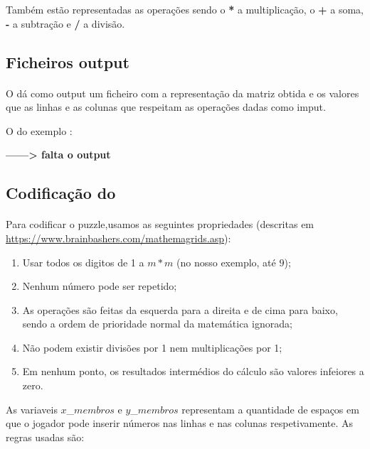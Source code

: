 \documentclass{article}
\begin{document}
Também estão representadas as operações sendo o {\bf{*}} a multiplicação, o  {\bf{+}} a soma, {\bf{-}} a subtração e {\bf{/}} a divisão. 

\subsection{Ficheiros output}
\paragraph{} 
O {} dá como output um ficheiro com a representação da matriz obtida e os valores que as linhas e as colunas que respeitam as operações dadas como imput.


O do exemplo :
\begin{center}
{\bf{------> falta o output}}
\end{center}

\subsection{Codificação do {}}
\paragraph{} Para codificar o puzzle,usamos as seguintes propriedades (descritas em {\url{https://www.brainbashers.com/mathemagrids.asp}}):
 \begin{enumerate}
 \item Usar todos os digitos de 1 a $m*m$ (no nosso exemplo, até $9$);
 \item Nenhum número pode ser repetido;
 \item As operações são feitas da esquerda para a direita e de cima para baixo, sendo a ordem de prioridade normal da matemática ignorada;
 \item Não podem existir divisões por 1 nem multiplicações por 1;
\item Em nenhum ponto, os resultados intermédios do cálculo são valores infeiores a zero.
 \end{enumerate}

As variaveis $x$\_$membros$ e $y$\_$membros$ representam a quantidade de espaços em que o jogador pode inserir números nas linhas e nas colunas respetivamente. As regras usadas são:
\end{document}
